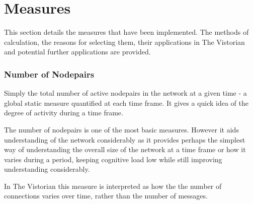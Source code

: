 
\chapter{Measures}

This section details the measures that have been implemented. The methods of calculation, the reasons for selecting them, their applications in The Vistorian and potential further applications are provided. 

\subsection{Number of Nodepairs}
Simply the total number of active nodepairs in the network at a given time - a global static measure quantified at each time frame. It gives a quick idea of the degree of activity during a time frame.

The number of nodepairs is one of the most basic measures. However it aids understanding of the network considerably as it provides perhaps the simplest way of understanding the overall size of the network at a time frame or how it varies during a period, keeping cognitive load low while still improving understanding considerably.

In The Vistorian this measure is interpreted as how the the number of connections varies over time, rather than the number of messages.


